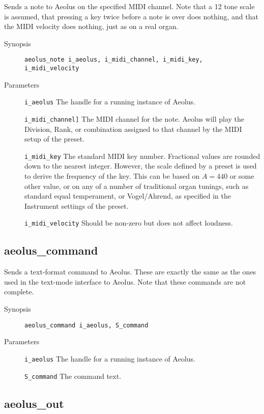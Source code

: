 \documentclass[english,11pt,letterpaper,onecolumn]{scrartcl}
\begin{document}
{Sends a note to Aeolus on the specified MIDI channel. Note that a 12 tone scale is assumed, that pressing a key twice before a note is over does nothing, and that the MIDI velocity does nothing, just as on a real organ.

\begin{description}
	\item[Synopsis]
	\item[]\lstinline|aeolus_note i_aeolus, i_midi_channel, i_midi_key, i_midi_velocity|
	\item[Parameters]
	\item[]\lstinline|i_aeolus| The handle for a running instance of Aeolus.
	\item[]\lstinline|i_midi_channel]| The MIDI channel for the note. Aeolus will play the Division, Rank, or combination assigned to that channel by the MIDI setup of the preset.
	\item[]\lstinline|i_midi_key| The standard MIDI key number. Fractional values are rounded down to the nearest integer. However, the scale defined by a preset is used to derive the frequency of the key. This can be based on $A = 440$ or some other value, or on any of a number of traditional organ tunings, such as standard equal temperament, or Vogel/Ahrend, as specified in the Instrument settings of the preset.
	\item[]\lstinline|i_midi_velocity| Should be non-zero but does not affect loudness.
\end{description}

\subsection*{aeolus\_command}

Sends a text-format command to Aeolus. These are exactly the same as the ones used in the text-mode interface to Aeolus. Note that these commands are not complete.

\begin{description}
	\item[Synopsis]
	\item[]\lstinline|aeolus_command i_aeolus, S_command|
	\item[Parameters]
	\item[]\lstinline|i_aeolus| The handle for a running instance of Aeolus.
	\item[]\lstinline|S_command| The command text.
\end{description}

\subsection*{aeolus\_out}

}
\end{document}
